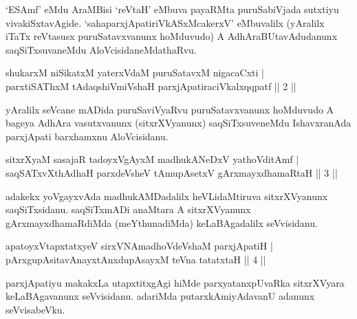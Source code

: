 \begin{artha}
`ESAmf' eMdu AraMBisi `reVtaH' eMbuva payaRMta puruSabiVjada 
sutxtiyu vivakiSxtavAgide. `sahaparxjApatiriVkASxMcakerxV' eMbuvalilx 
(yAralilx iTaTx reVtasusx puruSatavxvanunx hoMduvudo) A 
AdhAraBUtavAdudanunx saqSiTxsuvaneMdu AloVcisidaneMdathaRvu.
\end{artha}


\begin{shl}
shukarxM niSikatxM yaterxVdaM puruSatavxM nigacaCxti | \\
parxtiSAThxM tAdaqshiVmiVshaH parxjApatiraciVkalxqqpatf \hfill|| 2 || 
\end{shl}

\begin{artha}
yAralilx seVcane mADida puruSaviVyaRvu puruSatavxvanunx hoMduvudo A 
bageya AdhAra vasutxvanunx (sitxrXVyanunx) saqSiTxsuveneMdu 
IshavxranAda parxjApati barxhamxnu AloVcisidanu.
\end{artha}


\begin{shl}
sitxrXyaM sasajaR tadoyxVgAyxM \footnotemark[1]madhukANeDxV yathoVditAmf | \\
saqSATxvX\s thAdhaH parxdeVsheV tAmupAsetxV \footnotemark[2]gArxmayxdhamaRtaH \hfill|| 3 || 
\end{shl}

\begin{artha}
adakekx yoVgayxvAda madhukAMDadalilx heVLidaMtiruva sitxrXVyanunx 
saqSiTxsidanu. saqSiTxmADi anaMtara A sitxrXVyanunx 
gArxmayxdhamaRdiMda (meYthunadiMda) keLaBAga\-dalilx seVvisidanu.
\end{artha}


\begin{shl}
apatoyxVtapxtatxyeV sirxVNAmadhoVdeVshaM parxjApatiH | \\
pArxgupAsitavAnayxtAnxdupAsayxM teVna tatatxtaH \hfill|| 4 || 
\end{shl}

\begin{artha}
parxjApatiyu makakxLa utapxtitxgAgi hiMde parxyatanxpUvaRka 
sitxrXVyara keLaBAga\-vanunx seVvisidanu. adariMda putarxkAmiyAdavanU 
adanunx seVvisabeVku.
\end{artha}

